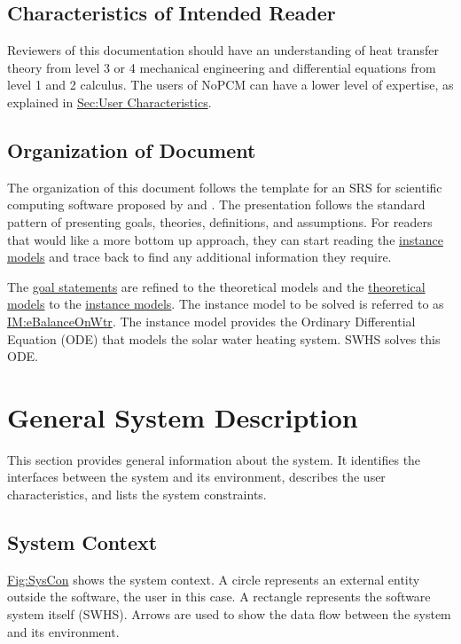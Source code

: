 \documentclass[12pt]{article}
\begin{document}
\subsection{Characteristics of Intended Reader}
\label{Sec:ReaderChars}
Reviewers of this documentation should have an understanding of heat transfer theory from level 3 or 4 mechanical engineering and differential equations from level 1 and 2 calculus. The users of NoPCM can have a lower level of expertise, as explained in \hyperref[Sec:UserChars]{Sec:User Characteristics}.

\subsection{Organization of Document}
\label{Sec:DocOrg}
The organization of this document follows the template for an SRS for scientific computing software proposed by \cite{koothoor2013} and \cite{smithLai2005}. The presentation follows the standard pattern of presenting goals, theories, definitions, and assumptions. For readers that would like a more bottom up approach, they can start reading the \hyperref[Sec:IMs]{instance models} and trace back to find any additional information they require.

The \hyperref[Sec:GoalStmt]{goal statements} are refined to the theoretical models and the \hyperref[Sec:TMs]{theoretical models} to the \hyperref[Sec:IMs]{instance models}. The instance model to be solved is referred to as \hyperref[IM:eBalanceOnWtr]{IM:eBalanceOnWtr}. The instance model provides the Ordinary Differential Equation (ODE) that models the solar water heating system. SWHS solves this ODE.

\section{General System Description}
\label{Sec:GenSysDesc}
This section provides general information about the system. It identifies the interfaces between the system and its environment, describes the user characteristics, and lists the system constraints.

\subsection{System Context}
\label{Sec:SysContext}
\hyperref[Figure:SysCon]{Fig:SysCon} shows the system context. A circle represents an external entity outside the software, the user in this case. A rectangle represents the software system itself (SWHS). Arrows are used to show the data flow between the system and its environment.
\end{document}
